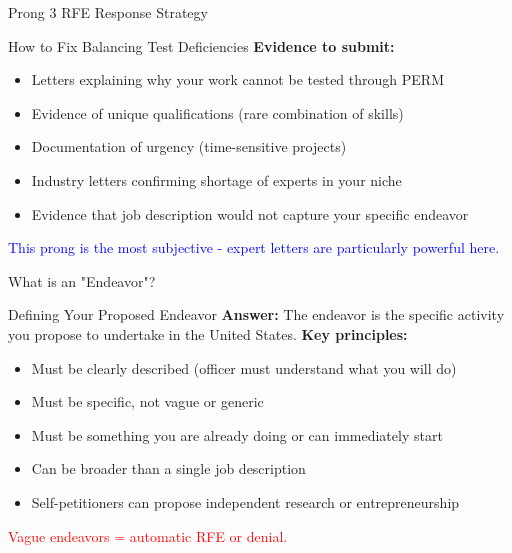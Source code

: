 \documentclass[11pt]{beamer}
\begin{document}
	\begin{frame}{Prong 3 RFE Response Strategy}
		\scriptsize
		\begin{block}{How to Fix Balancing Test Deficiencies}
			\textbf{Evidence to submit:}
			\begin{itemize}
				\item Letters explaining why your work cannot be tested through PERM
				\item Evidence of unique qualifications (rare combination of skills)
				\item Documentation of urgency (time-sensitive projects)
				\item Industry letters confirming shortage of experts in your niche
				\item Evidence that job description would not capture your specific endeavor
			\end{itemize}
			\textcolor{blue}{This prong is the most subjective - expert letters are particularly powerful here.}
		\end{block}
	\end{frame}
	
	
	\begin{frame}{What is an "Endeavor"?}
		\scriptsize
		\begin{block}{Defining Your Proposed Endeavor}
			\textbf{Answer:} The endeavor is the specific activity you propose to undertake in the United States.
			\vspace{0.2cm}
			\textbf{Key principles:}
			\begin{itemize}
				\item Must be clearly described (officer must understand what you will do)
				\item Must be specific, not vague or generic
				\item Must be something you are already doing or can immediately start
				\item Can be broader than a single job description
				\item Self-petitioners can propose independent research or entrepreneurship
			\end{itemize}
			\textcolor{red}{Vague endeavors = automatic RFE or denial.}
		\end{block}
	\end{frame}
	
\end{document}
